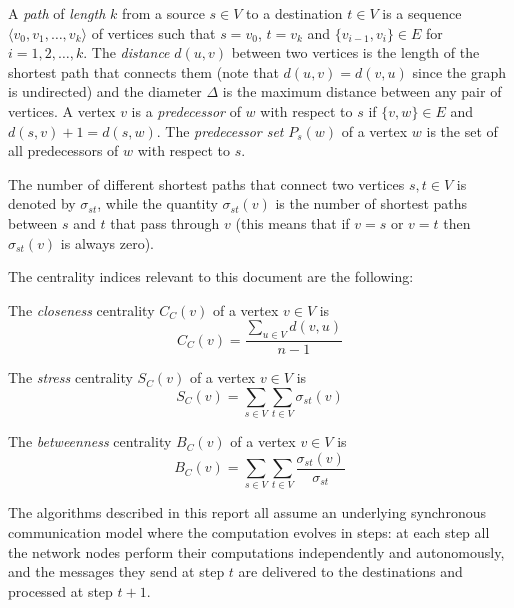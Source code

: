 A \emph{path} of \emph{length} $k$ from a source $s \in V$ to a destination $t \in V$ is a sequence $\langle v_0, v_1, \dots, v_k \rangle$ of vertices such that $s=v_0$, $t=v_k$ and $\{v_{i-1}, v_i\} \in E$ for $i = 1,2,\dots,k$. The \emph{distance} $d(u,v)$ between two vertices is the length of the shortest path that connects them (note that $d(u,v) = d(v,u)$ since the graph is undirected) and the diameter $\Delta$ is the maximum distance between any pair of vertices. A vertex $v$ is a \emph{predecessor} of $w$ with respect to $s$ if $\{v,w\} \in E$ and $d(s,v) +1 = d(s,w)$. The \emph{predecessor set} $P_s(w)$ of a vertex $w$ is the set of all predecessors of $w$ with respect to $s$.

The number of different shortest paths that connect two vertices $s,t \in V$ is denoted by $\sigma_{st}$, while the quantity $\sigma_{st}(v)$ is the number of shortest paths between $s$ and $t$ that pass through $v$ (this means that if $v = s$ or $v = t$ then $\sigma_{st}(v)$ is always zero).

The centrality indices relevant to this document are the following:
\begin{defcc} The \emph{closeness} centrality $C_C(v)$ of a vertex $v \in V$ is
\begin{equation}
 C_C(v) = \frac{\sum_{u \in V} d(v,u)}{n-1}
\end{equation}
\end{defcc}
\begin{defsc} The \emph{stress} centrality $S_C(v)$ of a vertex $v \in V$ is
\begin{equation}
 S_C(v) = \sum_{s \in V} \sum_{t \in V} \sigma_{st}(v)
\end{equation}
\end{defsc}
\begin{defbc} The \emph{betweenness} centrality $B_C(v)$ of a vertex $v \in V$ is
\begin{equation}
 B_C(v) = \sum_{s \in V} \sum_{t \in V} \frac{\sigma_{st}(v)}{\sigma_{st}}
\end{equation}
\end{defbc}

The algorithms described in this report all assume an underlying syn\-chro\-nous communication model where the computation evolves in steps: at each step all the network nodes perform their computations independently and autonomously, and the messages they send at step $t$ are delivered to the destinations and processed at step $t+1$.